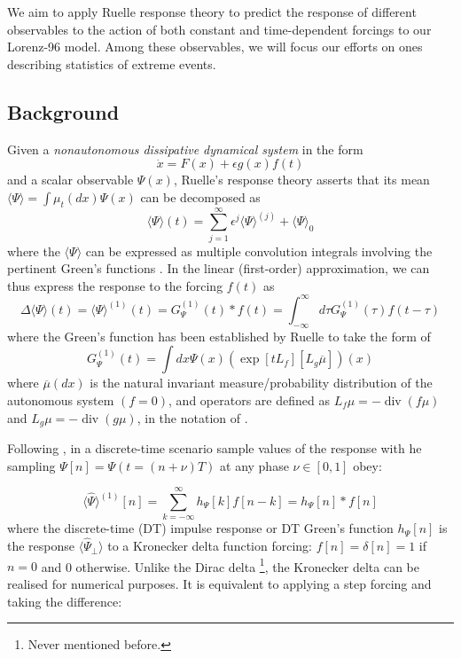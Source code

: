 \documentclass{article}
\begin{document}
We aim to apply Ruelle response theory \cite{Ruelle}\cite{Bodai} to predict the response of different observables to the action of both constant and time-dependent forcings to our Lorenz-96 model.
Among these observables, we will focus our efforts on ones describing statistics of extreme events.

\subsection{Background}

Given a \textit{nonautonomous dissipative dynamical system} in the form
\begin{equation}
\dot{x}=F(x)+\epsilon g(x) f(t)
\end{equation}
and a scalar observable $\Psi(x)$, Ruelle's response theory \cite{Ruelle} asserts that its mean $\langle\Psi\rangle=\int \mu_{t}(d x) \Psi(x)$ can be decomposed as
\begin{equation}
\langle\Psi\rangle(t)=\sum_{j=1}^{\infty} \epsilon^{j}\langle\Psi\rangle^{(j)} +\langle\Psi\rangle_{0}
\end{equation}
where the $\langle\Psi\rangle$ can be expressed as multiple convolution integrals involving the pertinent Green's functions \cite{LucariniClimateChange}. In the linear (first-order) approximation, we can thus express the response to the forcing $f(t)$ as
\begin{equation}
\Delta\langle\Psi\rangle(t)=\langle\Psi\rangle^{(1)}(t)=G_{\Psi}^{(1)}(t) * f(t)=\int_{-\infty}^{\infty} d \tau G_{\Psi}^{(1)}(\tau) f(t-\tau)
\end{equation}
where the Green's function has been established by Ruelle to take the form of
\begin{equation}
G_{\Psi}^{(1)}(t)=\int d x \Psi(x)\left(\exp \left[t L_{f}\right]\left[L_{g} \overline{\mu}\right]\right)(x)
\end{equation}
where $\overline{\mu}(d x)$ is the natural invariant measure/probability distribution of the autonomous system $(f = 0)$, and operators are defined as $L_{f} \mu=-\operatorname{div}(f \mu)$ and $L_{g} \mu=-\operatorname{div}(g \mu)$, in the notation of \cite{Abramov}.

Following \cite{Bodai}, in a discrete-time scenario sample values of the response with he sampling $\Psi[n]=\Psi(t=(n+\nu) T)$ at any phase $\nu \in[0,1]$ obey:

\begin{equation}
\langle\hat{\Psi}\rangle^{(1)}[n]=\sum_{k=-\infty}^{\infty} h_{\Psi}[k] f[n-k]=h_{\Psi}[n] * f[n]
\end{equation}
where the discrete-time (DT) impulse response or DT Green's function $h_{\Psi}[n]$ is the response $\langle\hat{\Psi}_{\perp}\rangle$ to a Kronecker delta function forcing: $f[n]=\delta[n]=1$ if $n=0$ and 0 otherwise. Unlike the Dirac delta \footnote{Never mentioned before.\label{fn8}}, the Kronecker delta can be realised for numerical purposes. It is equivalent to applying a step forcing and taking the difference: 
\end{document}
